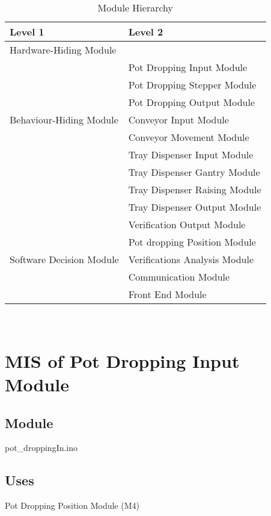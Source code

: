 \documentclass[12pt, titlepage]{article}
\begin{document}
\begin{table}[h!]
  \centering
  \begin{tabular}{p{} p{}}
  \toprule
  \textbf{Level 1} & \textbf{Level 2}\\
  \midrule
  
  {Hardware-Hiding Module} & ~ \\
  \midrule
  
  \multirow{7}{0.3\textwidth}{Behaviour-Hiding Module}
  & Pot Dropping Input Module \\
  & Pot Dropping Stepper Module\\
  & Pot Dropping Output Module\\
  & Conveyor Input Module\\
  & Conveyor Movement Module\\
  & Tray Dispenser Input Module\\ 
  & Tray Dispenser Gantry Module\\
  & Tray Dispenser Raising Module \\
  & Tray Dispenser Output Module \\
  & Verification Output Module \\
  
  \midrule
  
  \multirow{3}{0.3\textwidth}{Software Decision Module}
  & Pot dropping Position Module\\
  & Verifications Analysis Module\\
  & Communication Module\\
  & Front End Module\\
  \bottomrule
  
  \end{tabular}
  \caption{Module Hierarchy}
  \label{TblMH}
  \end{table}

\newpage
~\newpage

\section{MIS of Pot Dropping Input Module} \label{potdroppingInput} 


\subsection{Module}

pot\_droppingIn.ino

\subsection{Uses}
Pot Dropping Position Module (M4)
\end{document}
